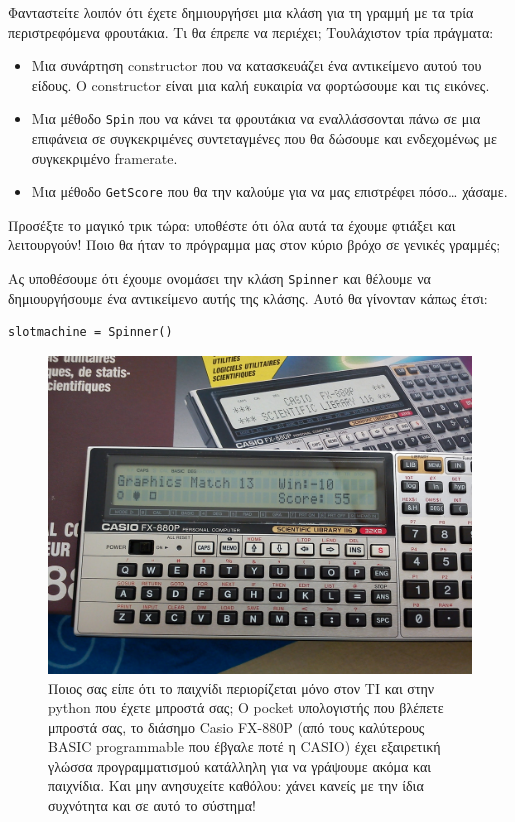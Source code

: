 Φανταστείτε λοιπόν ότι έχετε δημιουργήσει μια κλάση για τη γραμμή με τα τρία περιστρεφόμενα φρουτάκια. Τι θα έπρεπε να περιέχει; Τουλάχιστον τρία πράγματα:
%
\begin{itemize}
\item Μια συνάρτηση constructor που να κατασκευάζει ένα αντικείμενο αυτού του είδους. Ο constructor είναι μια καλή ευκαιρία να φορτώσουμε και τις εικόνες.
\item Μια μέθοδο {\tt Spin} που να κάνει τα φρουτάκια να εναλλάσσονται πάνω σε μια επιφάνεια σε συγκεκριμένες συντεταγμένες που θα δώσουμε και ενδεχομένως με συγκεκριμένο framerate.
\item Μια μέθοδο {\tt GetScore} που θα την καλούμε για να μας επιστρέφει πόσο\ldots{} χάσαμε.
\end{itemize}
%
Προσέξτε το μαγικό τρικ τώρα: υποθέστε ότι όλα αυτά τα έχουμε φτιάξει και λειτουργούν! Ποιο θα ήταν το πρόγραμμα μας στον κύριο βρόχο σε γενικές γραμμές;

Ας υποθέσουμε ότι έχουμε ονομάσει την κλάση {\tt Spinner} και θέλουμε να δημιουργήσουμε ένα αντικείμενο αυτής της κλάσης. Αυτό θα γίνονταν κάπως έτσι:

\begin{verbatim}
slotmachine = Spinner()
\end{verbatim}

\begin{figure}
\centering
\includegraphics[height=0.8\textheight]{images/chapter6/fx880}
\caption[CASIO FX-880P και Graphics Match]{Ποιος σας είπε ότι το παιχνίδι περιορίζεται μόνο στον ΤΙ και στην
python που έχετε μπροστά σας; O pocket υπολογιστής που βλέπετε μπροστά σας,
το διάσημο Casio FX-880P (από τους καλύτερους BASIC programmable που έβγαλε
ποτέ η CASIO) έχει εξαιρετική γλώσσα προγραμματισμού κατάλληλη για να
γράψουμε ακόμα και παιχνίδια.  Και μην ανησυχείτε καθόλου: χάνει κανείς με
την ίδια συχνότητα και σε αυτό το σύστημα!}
\label{6-3}
\end{figure}


